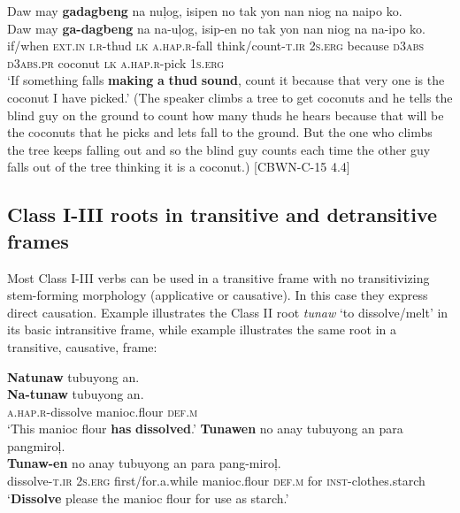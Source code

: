 \ea
\label{bkm:Ref444436899}
Daw  may  \textbf{gadagbeng}  na  nuļog,  isipen  no tak  yon nan  niog  na  naipo  ko. \\\smallskip
\gll Daw  may  \textbf{ga-dagbeng}  na  na-uļog,  isip-en  no tak  {yon} {nan}  niog  na  na-ipo  ko. \\
if/when  \textsc{ext.in}  \textsc{i.r}-thud  \textsc{lk}  \textsc{a.hap.r}-fall  think/count-\textsc{t.ir}  2\textsc{s.erg} because  \textsc{d}3\textsc{abs} \textsc{d}3\textsc{abs.pr}  coconut  \textsc{lk}  \textsc{a.hap.r}-pick  1\textsc{s.erg} \\
\glt ‘If something falls \textbf{making} \textbf{a} \textbf{thud} \textbf{sound}, count it because that very one is the coconut I have picked.’ (The speaker climbs a tree to get coconuts and he tells the blind guy on the ground to count how many thuds he hears because that will be the coconuts that he picks and lets fall to the ground. But the one who climbs the tree keeps falling out and so the blind guy counts each time the other guy falls out of the tree thinking it is a coconut.) [CBWN-C-15 4.4]
\z

\subsection{Class I-III roots in transitive and detransitive frames}
\label{bkm:Ref148791529}
Most Class I-III verbs can be used in a transitive frame with no transitivizing stem-forming morphology (applicative or causative). In this case they express direct causation. Example  illustrates the Class II root \textit{tunaw} ‘to dissolve/melt’ in its basic intransitive frame, while example  illustrates the same root in a transitive, causative, frame:

\ea
\label{ex:hasdissolved}
\textbf{Natunaw}  tubuyong  an. \\\smallskip
\gll \textbf{Na-tunaw}  tubuyong  an. \\
\textsc{a.hap.r}-dissolve  manioc.flour  \textsc{def.m} \\
\glt ‘This manioc flour \textbf{has} \textbf{dissolved}.’  
\z
\ea
\label{bkm:Ref395126196}
\textbf{Tunawen}  no  anay  tubuyong  an  para  pangmiroļ. \\\smallskip
\gll \textbf{Tunaw-en}  no  anay  tubuyong  an  para  pang-miroļ. \\
dissolve-\textsc{t.ir}  2\textsc{s.erg}  first/for.a.while  manioc.flour  \textsc{def.m}  for  \textsc{inst}-clothes.starch \\
\glt ‘\textbf{Dissolve} please the manioc flour for use as starch.’
\z

